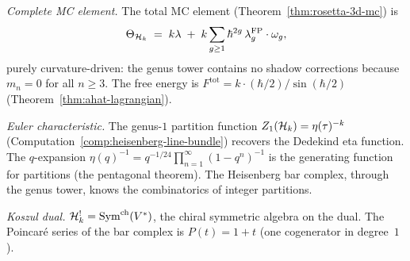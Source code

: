 \begin{computation}
\smallskip
\noindent
\emph{Complete MC element.}
The total MC element (Theorem~\ref{thm:rosetta-3d-mc}) is
\begin{equation}\label{eq:heisenberg-hydrogen-theta}
\Theta_{\mathcal{H}_k}
\;=\;
k\lambda
\;+\;
k \sum_{g \ge 1} \hbar^{2g}\, \lambda_g^{\mathrm{FP}} \cdot \omega_g,
\end{equation}
purely curvature-driven: the genus tower contains
no shadow corrections because $m_n = 0$ for all $n \ge 3$. The free energy is $F^{\mathrm{tot}} = k \cdot (\hbar/2)/\sin(\hbar/2)$
(Theorem~\ref{thm:ahat-lagrangian}).

\smallskip
\noindent
\emph{Euler characteristic.}
The genus-$1$ partition function
$Z_1(\mathcal{H}_k) = \eta(\tau)^{-k}$
(Computation~\ref{comp:heisenberg-line-bundle})
recovers the Dedekind eta function. The $q$-expansion
$\eta(q)^{-1} = q^{-1/24}\prod_{n=1}^{\infty}(1-q^n)^{-1}$
is the generating function for partitions (the
pentagonal theorem). The Heisenberg bar complex,
through the genus tower, knows the combinatorics of
integer partitions.

\smallskip
\noindent
\emph{Koszul dual.}
$\mathcal{H}_k^! = \mathrm{Sym}^{\mathrm{ch}}(V^*)$, the
chiral symmetric algebra on the dual.
The Poincar\'{e} series of the bar complex is
$P(t) = 1 + t$ (one cogenerator in degree~$1$).
\end{computation}

